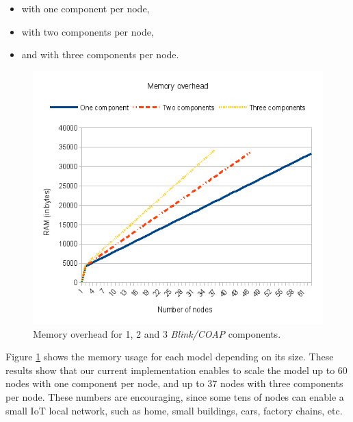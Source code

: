 \begin{itemize}
	\item with one component per node, 
	\item with two components per node,
	\item and with three components per node.
\end{itemize}

\begin{figure}[h]
	\centering
	\includegraphics[width=0.7\columnwidth]{chapters/modelsAtRuntimeContiki.images/MemoryOverhead3Nodes.png}
	\caption{Memory overhead for 1, 2 and 3 \emph{Blink/COAP} components.} \label{fig:MemUsedBlinkComps}
\end{figure}


Figure \ref{fig:MemUsedBlinkComps} shows the memory usage for each model depending on its size.
These results show that our current implementation enables to scale the model up to 60 nodes with one component per node, and up to 37 nodes with three components per node. These numbers are encouraging, since some tens of nodes can enable a small IoT local network, such as home, small buildings, cars, factory chains, etc.


